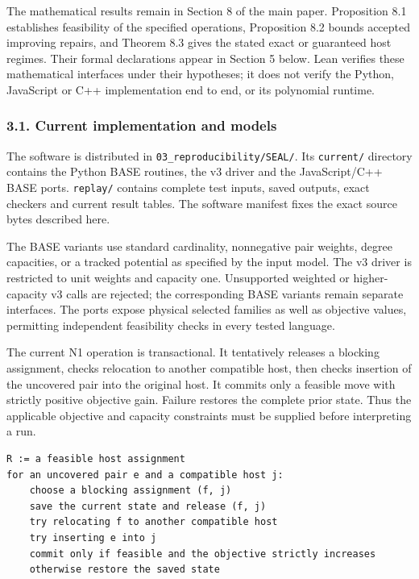 \documentclass[english,11pt,a4paper]{article}
\begin{document}
The mathematical results remain in Section 8 of the main paper.
Proposition 8.1 establishes feasibility of the specified operations,
Proposition 8.2 bounds accepted improving repairs, and Theorem 8.3 gives
the stated exact or guaranteed host regimes. Their formal declarations
appear in Section 5 below. Lean verifies these mathematical interfaces
under their hypotheses; it does not verify the Python, JavaScript or C++
implementation end to end, or its polynomial runtime.

\subsubsection{3.1. Current implementation and
models}\label{current-implementation-and-models}

The software is distributed in \nolinkurl{03_reproducibility/SEAL/}. Its
\texttt{current/} directory contains the Python BASE routines, the v3
driver and the JavaScript/C++ BASE ports. \texttt{replay/} contains
complete test inputs, saved outputs, exact checkers and current result
tables. The software manifest fixes the exact source bytes described
here.

The BASE variants use standard cardinality, nonnegative pair weights,
degree capacities, or a tracked potential as specified by the input
model. The v3 driver is restricted to unit weights and capacity one.
Unsupported weighted or higher-capacity v3 calls are rejected; the
corresponding BASE variants remain separate interfaces. The ports expose
physical selected families as well as objective values, permitting
independent feasibility checks in every tested language.

The current N1 operation is transactional. It tentatively releases a
blocking assignment, checks relocation to another compatible host, then
checks insertion of the uncovered pair into the original host. It
commits only a feasible move with strictly positive objective gain.
Failure restores the complete prior state. Thus the applicable objective
and capacity constraints must be supplied before interpreting a run.

\begin{verbatim}
R := a feasible host assignment
for an uncovered pair e and a compatible host j:
    choose a blocking assignment (f, j)
    save the current state and release (f, j)
    try relocating f to another compatible host
    try inserting e into j
    commit only if feasible and the objective strictly increases
    otherwise restore the saved state
\end{verbatim}
\end{document}
